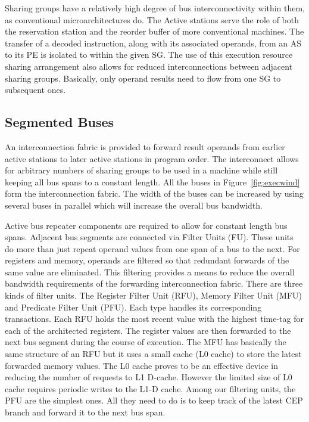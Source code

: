 \documentclass[10pt,twocolumn]{IEEEtran}
\begin{document}
Sharing groups have a relatively high degree of bus interconnectivity
within them, as conventional microarchitectures do. The Active stations
serve the role of both the reservation station and the reorder buffer
of more conventional machines. The transfer of a decoded instruction,
along with its associated operands, from an AS to its PE is isolated to
within the given SG. The use of this execution resource sharing
arrangement also allows for reduced interconnections between adjacent
sharing groups. Basically, only operand results need to flow from one
SG to subsequent ones.

\subsection {Segmented Buses}

An interconnection fabric is provided to forward result operands from
earlier active stations to later active stations in program order.  The
interconnect allows for arbitrary numbers of sharing groups to be used
in a machine while still keeping all bus spans to a constant length.
All the buses in Figure~\ref{fig:execwind} form the interconnection
fabric.  The width of the buses can be increased by using several buses
in parallel which will increase the overall bus bandwidth.

Active bus repeater components are required to allow for constant
length bus spans.  Adjacent bus segments are connected via Filter Units
(FU).  These units do more than just repeat operand values from one
span of a bus to the next.  For registers and  memory, operands are
filtered so that redundant forwards of the same value are eliminated.
This filtering provides a means to reduce the overall bandwidth
requirements of the forwarding interconnection fabric.  There are three
kinds of filter units.  The Register Filter Unit (RFU), Memory Filter
Unit (MFU) and Predicate Filter Unit (PFU).  Each type handles its
corresponding transactions.  Each RFU holds the most recent value with
the highest time-tag for each of the architected registers.  The
register values are then forwarded to the next bus segment during the
course of execution.
The MFU has basically the same structure of an RFU but it uses a small
cache (L0 cache) to store the latest forwarded memory values.  
The L0
cache proves to be an effective device in reducing the number of
requests to L1 D-cache.  However the limited size of L0 cache requires
periodic writes to the L1-D cache.  Among our filtering units, the PFU
are the simplest ones.  All they need to do is to keep track of the
latest CEP branch and forward it to the next bus span.
\end{document}
